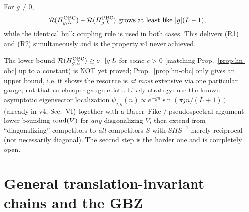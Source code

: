 \begin{corollary}
\label{cor:separation}
For $g\ne0$,
\begin{equation}
\mathcal R(H_{g,L}^{\rm OBC})-\mathcal R(H_{g,L}^{\rm PBC})
\ \text{grows at least like}\ |g|(L-1),
\end{equation}
while the identical bulk coupling rule is used in both cases. This
delivers (R1) and (R2) simultaneously and is the property v4 never
achieved.
\end{corollary}

\begin{todo}
The lower bound $\mathcal R(H_{g,L}^{\rm OBC})\ge c\cdot|g|L$ for some
$c>0$ (matching Prop.~\ref{prop:hn-obc} up to a constant) is NOT yet
proved; Prop.~\ref{prop:hn-obc} only gives an upper bound, i.e. it
shows the resource is \emph{at most} extensive via one particular
gauge, not that no cheaper gauge exists. Likely strategy: use the
known asymptotic eigenvector localization
$\psi_{j,g}(n)\propto e^{-gn}\sin(\pi jn/(L+1))$ (already in v4,
Sec.~VI) together with a Bauer--Fike / pseudospectral argument
lower-bounding $\operatorname{cond}(V)$ for \emph{any} diagonalizing $V$, then
extend from ``diagonalizing'' competitors to \emph{all} competitors
$S$ with $SHS^{-1}$ merely reciprocal (not necessarily diagonal).
The second step is the harder one and is completely open.
\end{todo}

\section{General translation-invariant chains and the GBZ}
\label{sec:gbz}

